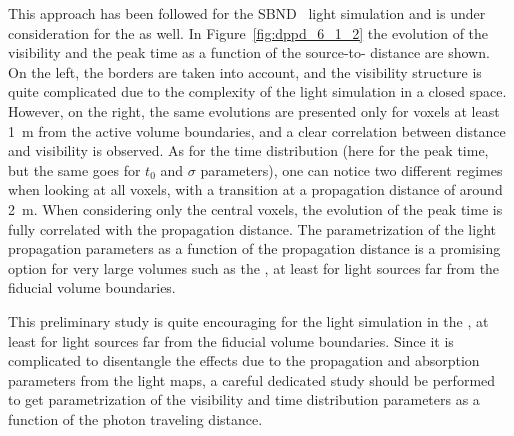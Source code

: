 This approach has been followed for the SBND~\cite{sbnd} light simulation and is under consideration for the  as well. In Figure~\ref{fig:dppd_6_1_2} the evolution of the visibility and the peak time as a function of the source-to- distance are shown. On the left, the borders are taken into account, and the visibility structure is quite complicated due to the complexity of the light simulation in a closed space. However, on the right, the same evolutions are presented only for voxels at least \SI{1}{m} from the active volume boundaries, and a clear correlation between distance and visibility is observed. As for the time distribution (here for the peak time, but the same goes for $t_0$ and $\sigma$ parameters), one can notice two different regimes when looking at all voxels, with a transition at a propagation distance of around  \SI{2}{m}. When considering only the central voxels, the evolution of the peak time is fully correlated with the propagation distance. The parametrization of the light propagation parameters as a function of the propagation distance is a promising option for very large volumes such as the , at least for light sources far from the fiducial volume boundaries. 

This preliminary study is quite encouraging for the light simulation in the , at least for light sources far from the fiducial volume boundaries. Since it is complicated to disentangle the effects due to the propagation and absorption parameters from the light maps, a careful dedicated study should be performed to get parametrization of the visibility and time distribution parameters as a function of the photon traveling distance. %

